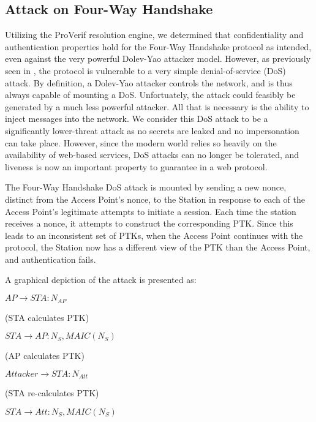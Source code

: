 \documentclass[11pt, twocolumn]{article} %
\begin{document}
{\subsection{Attack on Four-Way Handshake}
Utilizing the ProVerif resolution engine, we determined that confidentiality and authentication properties hold for the Four-Way Handshake protocol as intended, even against the very powerful Dolev-Yao attacker model.  However, as previously seen in \cite{he04}, the protocol is vulnerable to a very simple denial-of-service (DoS) attack.  By definition, a Dolev-Yao attacker controls the network, and is thus always capable of mounting a DoS.  Unfortuately, the attack could feasibly be generated by a much less powerful attacker.  All that is necessary is the ability to inject messages into the network.   We consider this DoS attack to be a significantly lower-threat attack as no secrets are leaked and no impersonation can take place. However, since the modern world relies so heavily on the availability of web-based services, DoS attacks can no longer be tolerated, and liveness is now an important property to guarantee in a web protocol.

The Four-Way Handshake DoS attack is mounted by sending a new nonce, distinct from the Access Point's nonce, to the Station in response to each of the Access Point's legitimate attempts to initiate a session.  Each time the station receives a nonce, it attempts to construct the corresponding PTK.  Since this leads to an inconsistent set of PTKs, when the Access Point continues with the protocol, the Station now has a different view of the PTK than the Access Point, and authentication fails.  

A graphical depiction of the attack is presented as:  

\begin{enumerate}[leftmargin=5mm]
{\small
\item $AP \rightarrow STA: N_{AP}$

{\tiny (STA calculates PTK)}

\item $STA \rightarrow AP: N_S, MAIC(N_S)$

{\tiny (AP calculates PTK) }

\item $Attacker \rightarrow STA: N_{Att}$

{\tiny (STA re-calculates PTK) }

\item $STA \rightarrow Att: N_S, MAIC(N_S)$

}
\end{enumerate}}
\end{document}
